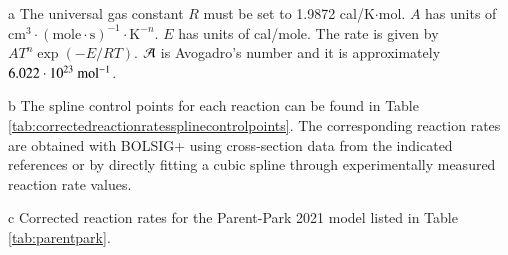 \documentclass{warpdoc}
\begin{document}
\begin{table}[t]
\begin{center}
\begin{threeparttable}
\begin{tabular}{cccccccc}
\bottomrule
\end{tabular}
\begin{tablenotes}
\item[{a}] The universal gas constant $R$ must be set to 1.9872	cal/K$\cdot$mol. $A$ has units of $\textrm{cm}^3\cdot(\textrm{mole}\cdot \textrm{s})^{-1}\cdot \textrm{K}^{-n}$. $E$ has units of cal/mole. The rate is given by $A T^n \exp(-E/RT)$. ${\cal A}$ is Avogadro's number and it is approximately $6.022 \cdot 10^{23}~{\rm mol^{-1}}$.
\item[{b}] The spline control points for each reaction can be found in Table \ref{tab:correctedreactionratessplinecontrolpoints}. The corresponding reaction rates are obtained with BOLSIG+ using cross-section data from the indicated references or by directly fitting a cubic spline through experimentally measured reaction rate values.
\item[{c}] Corrected reaction rates for the Parent-Park 2021 model listed in Table \ref{tab:parentpark}.
\end{tablenotes}
\label{tab:rodriguezpark2024a}
\end{threeparttable}
\end{center}
\end{table}
%
\end{document}
